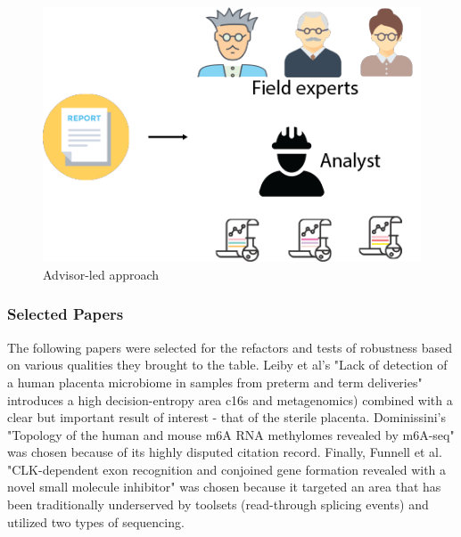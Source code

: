 \documentclass{drexelthesis}
\begin{document}
\begin{figure}[h!]
	\centering
	\includegraphics[width=13.68cm]{./images/advisor.png}
	\caption{Advisor-led approach}
	\label{advisor}
\end{figure}

\subsubsection{Selected Papers}

The following papers were selected for the refactors and tests of robustness based on various qualities they brought to the table. Leiby et al's "Lack of detection of a human placenta microbiome in samples from preterm and term deliveries" introduces a high decision-entropy area c16s and metagenomics) combined with a clear but important result of interest - that of the sterile placenta. Dominissini's "Topology of the human and mouse m6A RNA methylomes revealed by m6A-seq" was chosen because of its highly disputed citation record. Finally, Funnell et al. "CLK-dependent exon recognition and conjoined gene formation revealed with a novel small molecule inhibitor" was chosen because it targeted an area that has been traditionally underserved by toolsets (read-through splicing events) and utilized two types of sequencing.
\end{document}
